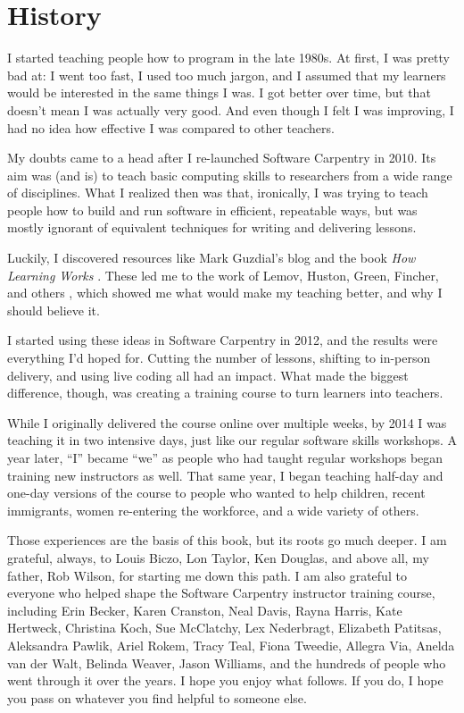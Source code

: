 \section*{History}

I started teaching people how to program in the late 1980s.  At first,
I was pretty bad at: I went too fast, I used too much jargon, and I
assumed that my learners would be interested in the same things I was.
I got better over time, but that doesn't mean I was actually very
good.  And even though I felt I was improving, I had no idea how
effective I was compared to other teachers.

My doubts came to a head after I re-launched Software Carpentry in
2010.  Its aim was (and is) to teach basic computing skills to
researchers from a wide range of disciplines.  What I realized then
was that, ironically, I was trying to teach people how to build and
run software in efficient, repeatable ways, but was mostly ignorant of
equivalent techniques for writing and delivering lessons.

Luckily, I discovered resources like Mark Guzdial's blog \cite{fixme}
and the book \emph{How Learning Works} \cite{fixme}.  These led me to
the work of Lemov, Huston, Green, Fincher, and others \cite{fixme},
which showed me what would make my teaching better, and why I should
believe it.

I started using these ideas in Software Carpentry in 2012, and the
results were everything I'd hoped for.  Cutting the number of lessons,
shifting to in-person delivery, and using live coding all had an
impact.  What made the biggest difference, though, was creating a
training course to turn learners into teachers.

While I originally delivered the course online over multiple weeks, by
2014 I was teaching it in two intensive days, just like our regular
software skills workshops.  A year later, ``I'' became ``we'' as
people who had taught regular workshops began training new instructors
as well.  That same year, I began teaching half-day and one-day
versions of the course to people who wanted to help children, recent
immigrants, women re-entering the workforce, and a wide variety of
others.

Those experiences are the basis of this book, but its roots go much
deeper.  I am grateful, always, to Louis Biczo, Lon Taylor, Ken
Douglas, and above all, my father, Rob Wilson, for starting me down
this path.  I am also grateful to everyone who helped shape the
Software Carpentry instructor training course, including Erin Becker,
Karen Cranston, Neal Davis, Rayna Harris, Kate Hertweck, Christina
Koch, Sue McClatchy, Lex Nederbragt, Elizabeth Patitsas, Aleksandra
Pawlik, Ariel Rokem, Tracy Teal, Fiona Tweedie, Allegra Via, Anelda
van der Walt, Belinda Weaver, Jason Williams, and the hundreds of
people who went through it over the years.  I hope you enjoy what
follows.  If you do, I hope you pass on whatever you find helpful to
someone else.

